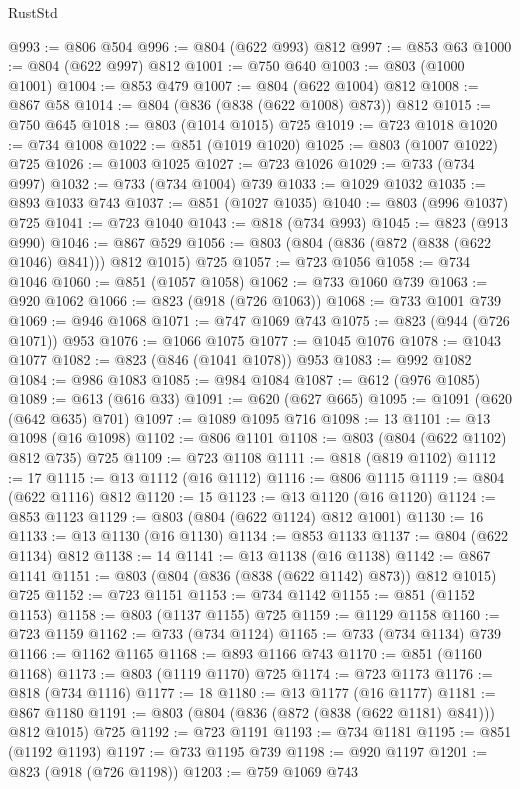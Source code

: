 \begin{lexlean}{RustStd}
\begin{coremodule}
@993 := @806 @504
@996 := @804 (@622 @993) @812
@997 := @853 @63
@1000 := @804 (@622 @997) @812
@1001 := @750 @640
@1003 := @803 (@1000 @1001)
@1004 := @853 @479
@1007 := @804 (@622 @1004) @812
@1008 := @867 @58
@1014 := @804 (@836 (@838 (@622 @1008) @873)) @812
@1015 := @750 @645
@1018 := @803 (@1014 @1015) @725
@1019 := @723 @1018
@1020 := @734 @1008
@1022 := @851 (@1019 @1020)
@1025 := @803 (@1007 @1022) @725
@1026 := @1003 @1025
@1027 := @723 @1026
@1029 := @733 (@734 @997)
@1032 := @733 (@734 @1004) @739
@1033 := @1029 @1032
@1035 := @893 @1033 @743
@1037 := @851 (@1027 @1035)
@1040 := @803 (@996 @1037) @725
@1041 := @723 @1040
@1043 := @818 (@734 @993)
@1045 := @823 (@913 @990)
@1046 := @867 @529
@1056 := @803 (@804 (@836 (@872 (@838 (@622 @1046) @841))) @812 @1015) @725
@1057 := @723 @1056
@1058 := @734 @1046
@1060 := @851 (@1057 @1058)
@1062 := @733 @1060 @739
@1063 := @920 @1062
@1066 := @823 (@918 (@726 @1063))
@1068 := @733 @1001 @739
@1069 := @946 @1068
@1071 := @747 @1069 @743
@1075 := @823 (@944 (@726 @1071)) @953
@1076 := @1066 @1075
@1077 := @1045 @1076
@1078 := @1043 @1077
@1082 := @823 (@846 (@1041 @1078)) @953
@1083 := @992 @1082
@1084 := @986 @1083
@1085 := @984 @1084
@1087 := @612 (@976 @1085)
@1089 := @613 (@616 @33)
@1091 := @620 (@627 @665)
@1095 := @1091 (@620 (@642 @635) @701)
@1097 := @1089 @1095 @716
@1098 := 13
@1101 := @13 @1098 (@16 @1098)
@1102 := @806 @1101
@1108 := @803 (@804 (@622 @1102) @812 @735) @725
@1109 := @723 @1108
@1111 := @818 (@819 @1102)
@1112 := 17
@1115 := @13 @1112 (@16 @1112)
@1116 := @806 @1115
@1119 := @804 (@622 @1116) @812
@1120 := 15
@1123 := @13 @1120 (@16 @1120)
@1124 := @853 @1123
@1129 := @803 (@804 (@622 @1124) @812 @1001)
@1130 := 16
@1133 := @13 @1130 (@16 @1130)
@1134 := @853 @1133
@1137 := @804 (@622 @1134) @812
@1138 := 14
@1141 := @13 @1138 (@16 @1138)
@1142 := @867 @1141
@1151 := @803 (@804 (@836 (@838 (@622 @1142) @873)) @812 @1015) @725
@1152 := @723 @1151
@1153 := @734 @1142
@1155 := @851 (@1152 @1153)
@1158 := @803 (@1137 @1155) @725
@1159 := @1129 @1158
@1160 := @723 @1159
@1162 := @733 (@734 @1124)
@1165 := @733 (@734 @1134) @739
@1166 := @1162 @1165
@1168 := @893 @1166 @743
@1170 := @851 (@1160 @1168)
@1173 := @803 (@1119 @1170) @725
@1174 := @723 @1173
@1176 := @818 (@734 @1116)
@1177 := 18
@1180 := @13 @1177 (@16 @1177)
@1181 := @867 @1180
@1191 := @803 (@804 (@836 (@872 (@838 (@622 @1181) @841))) @812 @1015) @725
@1192 := @723 @1191
@1193 := @734 @1181
@1195 := @851 (@1192 @1193)
@1197 := @733 @1195 @739
@1198 := @920 @1197
@1201 := @823 (@918 (@726 @1198))
@1203 := @759 @1069 @743

\end{coremodule}
\end{lexlean}
